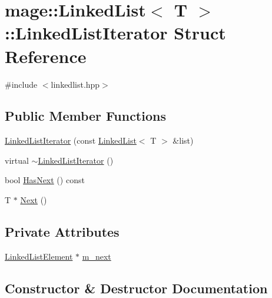 \hypertarget{structmage_1_1_linked_list_1_1_linked_list_iterator}{}\section{mage\+:\+:Linked\+List$<$ T $>$\+:\+:Linked\+List\+Iterator Struct Reference}
\label{structmage_1_1_linked_list_1_1_linked_list_iterator}


{\ttfamily \#include $<$linkedlist.\+hpp$>$}

\subsection*{Public Member Functions}
\begin{DoxyCompactItemize}
\item 
\hyperlink{structmage_1_1_linked_list_1_1_linked_list_iterator_a5353da2850d87cebb02f04833061c7a0}{Linked\+List\+Iterator} (const \hyperlink{classmage_1_1_linked_list}{Linked\+List}$<$ T $>$ \&list)
\item 
virtual \hyperlink{structmage_1_1_linked_list_1_1_linked_list_iterator_a16631a6dc7aaaad10ba676f569da62b9}{$\sim$\+Linked\+List\+Iterator} ()
\item 
bool \hyperlink{structmage_1_1_linked_list_1_1_linked_list_iterator_ae23127f7be560d81bbda5321690a7ef9}{Has\+Next} () const
\item 
T $\ast$ \hyperlink{structmage_1_1_linked_list_1_1_linked_list_iterator_aaffb4ff395841103f65d09b2784ad61f}{Next} ()
\end{DoxyCompactItemize}
\subsection*{Private Attributes}
\begin{DoxyCompactItemize}
\item 
\hyperlink{structmage_1_1_linked_list_1_1_linked_list_element}{Linked\+List\+Element} $\ast$ \hyperlink{structmage_1_1_linked_list_1_1_linked_list_iterator_a2936c8e80e5ef746150a8a93ef1300cb}{m\+\_\+next}
\end{DoxyCompactItemize}


\subsection{Constructor \& Destructor Documentation}
\hypertarget{structmage_1_1_linked_list_1_1_linked_list_iterator_a5353da2850d87cebb02f04833061c7a0}{}\label{structmage_1_1_linked_list_1_1_linked_list_iterator_a5353da2850d87cebb02f04833061c7a0} 
